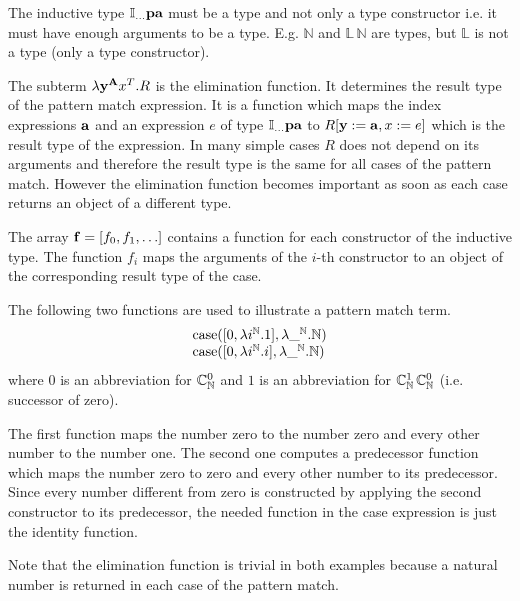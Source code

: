 \begin{description}
    The inductive type $\mathbb{I}_{\ldots} \mathbf{p} \mathbf{a}$ must be a type and
    not only a type constructor i.e. it must have enough arguments to be a type.
    E.g. $\mathbb{N}$ and $\mathbb{L}\, \mathbb{N}$ are types, but $\mathbb{L}$
    is not a type (only a type constructor).

    The subterm $\lambda \mathbf{y}^{\mathbf{A}} x^T.R$ is the elimination function. It
    determines the result type of the pattern match expression. It is a function
    which maps the index expressions $\mathbf{a}$ and an expression $e$ of type
    $\mathbb{I}_{\ldots} \mathbf{p} \mathbf{a}$ to $R[\mathbf{y} := \mathbf{a}, x:=e]$
    which is the result type of the expression. In many simple cases $R$ does
    not depend on its arguments and therefore the result type is the same for
    all cases of the pattern match. However the elimination function becomes
    important as soon as each case returns an object of a different type.

    The array $\mathbf{f} = [f_0, f_1, \ldots]$ contains a function for each
    constructor of the inductive type. The function $f_i$ maps the arguments of
    the $i$-th constructor to an object of the corresponding result type of the
    case.

    The following two functions are used to illustrate a pattern match term.
    {\def\Nat{\mathbb{N}}
      $$
      \begin{array}{l}
          \case ([ 0 , \lambda i^\Nat. 1], \lambda \_^\Nat. \Nat)

          \\

          \case ([ 0, \lambda i^\Nat. i], \lambda \_^\Nat. \Nat)
      \end{array}
      $$
      where $0$ is an abbreviation for $\Constructor^0_\Nat$ and $1$ is an
      abbreviation for $\Constructor^1_\Nat\, \Constructor^0_\Nat$
      (i.e. successor of zero).
    }

    The first function maps the number zero to the number zero and every other
    number to the number one. The second one computes a predecessor function
    which maps the number zero to zero and every other number to its
    predecessor. Since every number different from zero is constructed by
    applying the second constructor to its predecessor, the needed function in
    the case expression is just the identity function.

    Note that the elimination function is trivial in both examples because a
    natural number is returned in each case of the pattern match.


\end{description}
